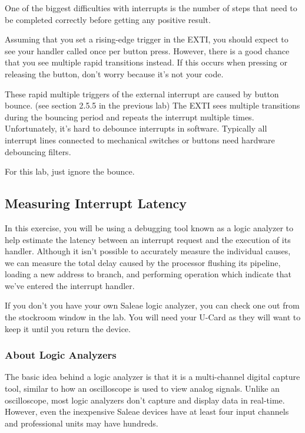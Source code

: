 \documentclass[11pt,fleqn]{book} %
\begin{document}
One of the biggest difficulties with interrupts is the number of steps that need to be completed correctly before getting any positive result. 

Assuming that you set a rising-edge trigger in the EXTI, you should expect to see your handler called once per button press. However, there is a good chance that you see multiple rapid transitions instead. If this occurs when pressing or releasing the button, don't worry because it's not your code.

These rapid multiple triggers of the external interrupt are caused by button bounce. (see section 2.5.5 in the previous lab) The EXTI sees multiple transitions during the bouncing period and repeats the interrupt multiple times. Unfortunately, it's hard to debounce interrupts in software. Typically all interrupt lines connected to mechanical switches or buttons need hardware debouncing filters.

 For this lab, just ignore the bounce.

\subsection{Measuring Interrupt Latency}
In this exercise, you will be using a debugging tool known as a logic analyzer to help estimate the latency between an interrupt request and the execution of its handler. Although it isn't possible to accurately measure the individual causes, we can measure the total delay caused by the processor flushing its pipeline, loading a new address to branch, and performing operation which indicate that we've entered the interrupt handler. 

If you don't you have your own Saleae logic analyzer, you can check one out from the stockroom window in the lab. You will need your U-Card as they will want to keep it until you return the device. 

\subsubsection{About Logic Analyzers}

The basic idea behind a logic analyzer is that it is a multi-channel digital capture tool, similar to how an oscilloscope is used to view analog signals. Unlike an oscilloscope, most logic analyzers don't capture and display data in real-time. However, even the inexpensive Saleae devices have at least four input channels and professional units may have hundreds. 
\end{document}
